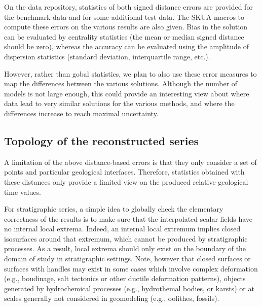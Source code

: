 \documentclass[preprint]{ring20}
\begin{document}
On the data repository, statistics of both signed distance errors are provided for the benchmark data and for some additional test data. The SKUA macros to compute these errors on the various results are also given. Bias in the solution can be evaluated by centrality statistics (the mean or median signed distance should be zero), whereas the accuracy can be evaluated using the amplitude of dispersion statistics (standard deviation, interquartile range, etc.). 

However, rather than gobal statistics, we plan to also use these error measures to map the differences between the various solutions. Although the number of models is not large enough, this could provide an interesting view about where data lead to very similar solutions for the various methods, and where the differences increase to reach maximal uncertainty.  


\subsection{Topology of the reconstructed series}

A limitation of the above distance-based errors is that they only consider a set of points and particular geological interfaces. Therefore, statistics obtained with these distances only provide a limited view on the produced relative geological time values. 

For stratigraphic series, a simple idea to globally check the elementary correctness of the results is to make sure that the interpolated scalar fields have no internal local extrema. Indeed, an internal local extremum implies closed isosurfaces around that extremum, which cannot be produced by stratigraphic processes. As a result, local extrema should only exist on the boundary of the domain of study in stratigraphic settings. Note, however that closed surfaces or surfaces with handles may exist in some cases which involve complex deformation (e.g., boudinage, salt tectonics or other ductile deformation patterns), objects generated by hydrochemical processes (e.g., hydrothemal bodies, or karsts) or at scales generally not considered in geomodeling (e.g., oolithes, fossils). 
\end{document}
